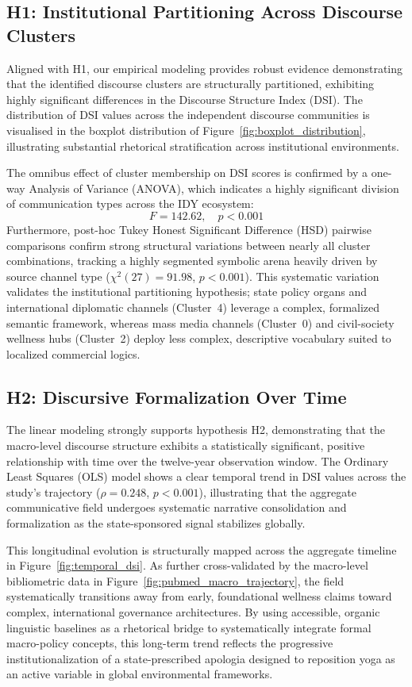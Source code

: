 \documentclass[11pt]{article}
\begin{document}
\subsection{H1: Institutional Partitioning Across Discourse Clusters}
Aligned with H1, our empirical modeling provides robust evidence demonstrating that the identified discourse clusters are structurally partitioned, exhibiting highly significant differences in the Discourse Structure Index (DSI). The distribution of DSI values across the independent discourse communities is visualised in the boxplot distribution of Figure~\ref{fig:boxplot_distribution}, illustrating substantial rhetorical stratification across institutional environments. 

The omnibus effect of cluster membership on DSI scores is confirmed by a one-way Analysis of Variance (ANOVA), which indicates a highly significant division of communication types across the IDY ecosystem:
\begin{equation}
    F = 142.62, \quad p < 0.001
\end{equation}
Furthermore, post-hoc Tukey Honest Significant Difference (HSD) pairwise comparisons confirm strong structural variations between nearly all cluster combinations, tracking a highly segmented symbolic arena heavily driven by source channel type ($\chi^2(27) = 91.98$, $p < 0.001$). This systematic variation validates the institutional partitioning hypothesis; state policy organs and international diplomatic channels (Cluster~4) leverage a complex, formalized semantic framework, whereas mass media channels (Cluster~0) and civil-society wellness hubs (Cluster~2) deploy less complex, descriptive vocabulary suited to localized commercial logics.

\subsection{H2: Discursive Formalization Over Time}
The linear modeling strongly supports hypothesis H2, demonstrating that the macro-level discourse structure exhibits a statistically significant, positive relationship with time over the twelve-year observation window. The Ordinary Least Squares (OLS) model shows a clear temporal trend in DSI values across the study's trajectory ($\rho = 0.248$, $p < 0.001$), illustrating that the aggregate communicative field undergoes systematic narrative consolidation and formalization as the state-sponsored signal stabilizes globally. 

This longitudinal evolution is structurally mapped across the aggregate timeline in Figure~\ref{fig:temporal_dsi}. As further cross-validated by the macro-level bibliometric data in Figure~\ref{fig:pubmed_macro_trajectory}, the field systematically transitions away from early, foundational wellness claims toward complex, international governance architectures. By using accessible, organic linguistic baselines as a rhetorical bridge to systematically integrate formal macro-policy concepts, this long-term trend reflects the progressive institutionalization of a state-prescribed apologia designed to reposition yoga as an active variable in global environmental frameworks.
\end{document}
